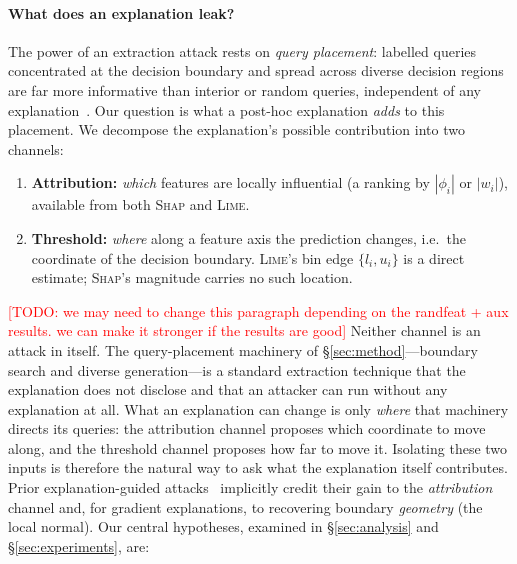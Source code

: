 \documentclass[sigconf,anonymous,review]{acmart}
\newcommand{\TODO}[1]{\textcolor{red}{[TODO: #1]}}
\begin{document}
\paragraph{What does an explanation leak?}
The power of an extraction attack rests on \emph{query placement}: labelled queries
concentrated at the decision boundary and spread across diverse decision regions are far
more informative than interior or random queries, independent of any
explanation~\cite{pal2020activethief}. Our question is what a post-hoc explanation
\emph{adds} to this placement. We decompose the explanation's possible contribution into
two channels:
\begin{enumerate}
  \item \textbf{Attribution:} \emph{which} features are locally influential
  (a ranking by $|\phi_i|$ or $|w_i|$), available from both \textsc{Shap} and
  \textsc{Lime}.
  \item \textbf{Threshold:} \emph{where} along a feature axis the prediction
  changes, i.e.\ the coordinate of the decision boundary. \textsc{Lime}'s bin edge
  $\{l_i, u_i\}$ is a direct estimate; \textsc{Shap}'s magnitude carries no such
  location.
\end{enumerate}
\TODO{we may need to change this paragraph depending on the randfeat + aux results. we can make it stronger if the results are good}
Neither channel is an attack in itself. The query-placement machinery of \S\ref{sec:method}---boundary
search and diverse generation---is a standard extraction technique that the explanation does not
disclose and that an attacker can run without any explanation at all. What an explanation can change is
only \emph{where} that machinery directs its queries: the attribution channel proposes which coordinate
to move along, and the threshold channel proposes how far to move it. Isolating these two inputs is
therefore the natural way to ask what the explanation itself contributes. Prior explanation-guided
attacks~\cite{oksuz2024autolycus,milli2019model} implicitly credit their gain to the
\emph{attribution} channel and, for gradient explanations, to recovering boundary \emph{geometry} (the
local normal). Our central hypotheses, examined
in \S\ref{sec:analysis} and \S\ref{sec:experiments}, are:
\end{document}
